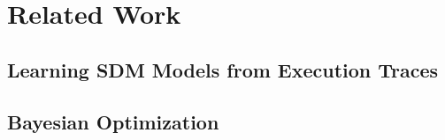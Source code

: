 \chapter{Related Work}
\label{ch:related-work}


\section{Learning SDM Models from Execution Traces}
\label{sec:learning-models}



\section{Bayesian Optimization}
\label{sec:bayesian-optimization}



%
%
